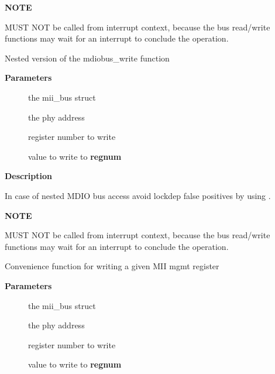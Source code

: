 \documentclass[a4paper,8pt,english]{sphinxmanual}
\begin{document}
\textbf{NOTE}

MUST NOT be called from interrupt context,
because the bus read/write functions may wait for an interrupt
to conclude the operation.

\begin{fulllineitems}
\label{networking/kapi:c.mdiobus_write_nested}
Nested version of the mdiobus\_write function

\end{fulllineitems}


\textbf{Parameters}
\begin{description}
\item[{}] \leavevmode
the mii\_bus struct

\item[{}] \leavevmode
the phy address

\item[{}] \leavevmode
register number to write

\item[{}] \leavevmode
value to write to \textbf{regnum}

\end{description}

\textbf{Description}

In case of nested MDIO bus access avoid lockdep false positives by
using .

\textbf{NOTE}

MUST NOT be called from interrupt context,
because the bus read/write functions may wait for an interrupt
to conclude the operation.

\begin{fulllineitems}
\label{networking/kapi:c.mdiobus_write}
Convenience function for writing a given MII mgmt register

\end{fulllineitems}


\textbf{Parameters}
\begin{description}
\item[{}] \leavevmode
the mii\_bus struct

\item[{}] \leavevmode
the phy address

\item[{}] \leavevmode
register number to write

\item[{}] \leavevmode
value to write to \textbf{regnum}

\end{description}
\end{document}
